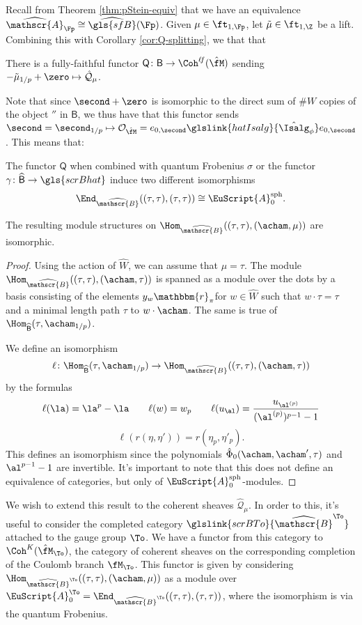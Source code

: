 Recall from Theorem \ref{thm:pStein-equiv} that we have an equivalence $\widehat{\mathscr{A}}_{\Fp}\cong \widehat{\gls{sfB}}(\Fp)$. Given $\mu\in \ft_{1,\Fp}$, let $\tilde{\mu}\in \ft_{1,\Z}$ be a lift. Combining this with Corollary \ref{cor:Q-splitting}, we that that
\begin{lemma}\label{lem:Gamma-iso}
There is a fully-faithful functor $\mathsf{Q}\colon \mathsf{B}\to  \Coh^{\ell \!f}(\hat{\fM})$ sending $- \tilde{\mu}_{1/p}+\zero\mapsto \mathcal{\hat Q}_\mu$.  \end{lemma}
Note that since $\second+\zero$ is isomorphic to the direct sum of $\# W$ copies of the object $\second$ in $\mathsf{B}$, we thus have that this functor sends $\second=\second_{1/p}\mapsto \mathcal{O}_{\hat{\fM}}=e_{0,\second}\glslink{hatIsalg}{\hat{\Isalg}_\phi} e_{0,\second}$. This means that:
\begin{lemma}\label{lem:Frob-or-B}
  The functor $\mathsf{Q}$ when combined with quantum Frobenius $\sigma$ or the functor $\gamma\colon \widehat{\mathsf{B}}\to \gls{scrBhat}$ induce two different isomorphisms \[\End_{\widehat{\mathscr{B}}}((\tau, \tau),(\tau, \tau))\cong \EuScript{A}^{\operatorname{sph}}_0.\]

The resulting module structures on $\Hom_{\widehat{\mathscr{B}}}( (\tau,\tau),(\acham,\mu))$ are isomorphic.  
\end{lemma}
\begin{proof}
  Using the action of $\widehat{W}$, we can assume that $\mu=\tau$.
  The module $\Hom_{\widehat{\mathscr{B}}}( (\tau,\tau),(\acham,\tau))$ is spanned as a module over the dots by a basis consisting of the elements $y_w\mathbbm{r}_{\pi}$for $w\in \widehat{W}$ such that $w\cdot \tau=\tau$ and  a minimal length path $\tau$ to $w\cdot \acham$.  The same is true of $\Hom_{\widehat{\mathsf{B}}}(\tau,\acham_{1/p})$.

  We define an isomorphism \[\ell\colon \Hom_{\widehat{\mathsf{B}}}(\tau,\acham_{1/p})\to \Hom_{\widehat{\mathscr{B}}}( (\tau,\tau),(\acham,\tau)) \]
by the formulas
\[ \ell(\la)=\la^p-\la \qquad \ell(w)=w_p\qquad\ell(u_{\al})=\frac{u_{\al^{(p)}}}{(\al^{(p)})^{p-1}-1}\]
\[\ell(r(\eta,\eta')) =r(\eta_{p},\eta'_{p}).\]
This defines an isomorphism since the polynomials $\hat \Phi_0(\acham,\acham',\tau)$ and $\al^{p-1}-1$ are invertible.  It's important to note that this does not define an equivalence of categories, but only of $\EuScript{A}^{\operatorname{sph}}_0$-modules.
\end{proof}

We wish to extend this result to the coherent sheaves $\mathcal{\hat Q}_\mu$.  In order to this, it's useful to  consider the completed category $\glslink{scrBTo}{\widehat{\mathscr{B}}^{\To}}$ attached to the gauge group $\To$.  We have a functor from this category to $\Coh^K(\hat{\fM}_{\To})$, the category of coherent sheaves on the corresponding completion of the Coulomb branch $\fM _{\To}$.  This functor is given by considering $\Hom_{\widehat{\mathscr{B}}^{\To}}( (\tau,\tau),(\acham,\mu))$ as a module over $\EuScript{A}^{\To}_0=\End_{\widehat{\mathscr{B}}^{\To}}((\tau, \tau),(\tau, \tau))$, where the isomorphism is via the quantum Frobenius.

